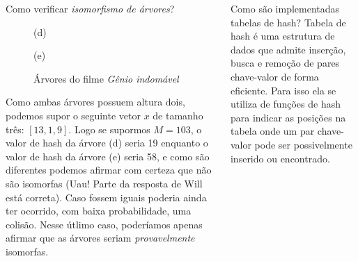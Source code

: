 \documentclass{beamer}
\begin{document}
\begin{frame}
\begin{columns}[t]
\begin{column}{.5\textwidth}
\begin{block}{Como verificar \emph{isomorfismo de árvores}?}
\begin{figure}
\begin{minipage}{0.5\textwidth}
        (d)
      \end{minipage}\begin{minipage}{0.5\textwidth}
        \centering
        
        (e)
      \end{minipage}
      \caption{Árvores do filme \textit{Gênio indomável}}
      \label{fig:filmtree}
    \end{figure}

    Como ambas árvores possuem altura dois, podemos supor o seguinte vetor \( x \) de tamanho três: \( [13, 1, 9] \). Logo se supormos \( M = 103 \), o valor de hash da árvore (d) seria 19 enquanto o valor de hash da árvore (e) seria 58, e como são diferentes podemos afirmar com certeza que não são isomorfas (Uau! Parte da resposta de Will está correta). Caso fossem iguais poderia ainda ter ocorrido, com baixa probabilidade, uma colisão. Nesse útlimo caso, poderíamos apenas afirmar que as árvores seriam \emph{provavelmente} isomorfas.
  \end{block}
\end{column}

\begin{column}{0.5\textwidth}
  \begin{block}{Como são implementadas tabelas de hash?}
    Tabela de hash é uma estrutura de dados que admite inserção, busca e remoção de pares chave-valor de forma eficiente. Para isso ela se utiliza de funções de hash para indicar as posições na tabela onde um par chave-valor pode ser possivelmente inserido ou encontrado.
    

\end{block}
\end{column}
\end{columns}
\end{frame}
\end{document}
